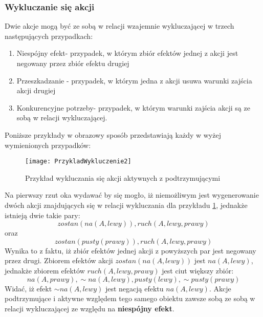     \subsubsection{Wykluczanie się akcji}
    Dwie akcje mogą być ze sobą w relacji wzajemnie wykluczającej w trzech następujących przypadkach:
    \begin{enumerate}
        \item Niespójny efekt- przypadek, w którym zbiór efektów jednej z akcji 
        jest negowany przez zbiór efektu drugiej
        \item Przeszkadzanie - przypadek, w którym jedna z akcji usuwa warunki 
        zajścia akcji drugiej 
        \item Konkurencyjne potrzeby- przypadek, w którym warunki zajścia akcji 
        są ze sobą w relacji wykluczającej.
    \end{enumerate}
    Poniższe przykłady w obrazowy sposób przedstawiają każdy w wyżej wymienionych
    przypadków:

    \begin{figure}[H]
        \texttt{[image: PrzykladWykluczenie2]}
        \centering
        \caption{Przykład wykluczania się akcji aktywnych z podtrzymującymi}
        \label{PrzykladWykluczenie2}
    \end{figure}

    Na pierwszy rzut oka wydawać by się mogło, iż niemożliwym jest wygenerowanie dwóch akcji znajdujących się w relacji wykluczania dla przykładu 
    \ref{PrzykladWykluczenie2}, jednakże istnieją dwie takie pary: 
    \begin{equation}
        zostan(na(A,lewy)),ruch(A,lewy,prawy)
    \end{equation} 
    oraz 
    \begin{equation}
        zostan(pusty(prawy)),ruch(A,lewy,prawy)
    \end{equation} 
    Wynika to z faktu, iż zbiór efektów jednej akcji z powyższych par jest negowany przez drugi. Zbiorem efektów akcji 
    $zostan(na(A,lewy))$ jest $na(A,lewy)$, jednakże zbiorem efektów $ruch(A,lewy,prawy)$ jest ciut większy zbiór:
    \begin{equation}
        na(A,prawy), \sim na(A,lewy), pusty(lewy), \sim pusty(prawy)
    \end{equation}
    Widać, iż efekt $\sim na(A,lewy)$ jest negacją efektu $na(A,lewy)$. Akcje podtrzymujące i aktywne względem tego samego obiektu zawsze sobą ze sobą 
    w relacji wykluczającej ze względu na \textbf{niespójny efekt}.

